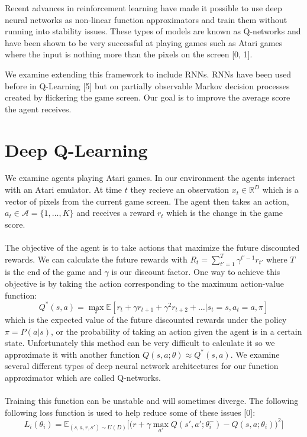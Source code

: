\documentclass{article}
\begin{document}
Recent advances in reinforcement learning have made it possible to use deep
neural networks as non-linear function approximators and train them without
running into stability issues. These types of models are known as Q-networks and
have been shown to be very successful at playing games such as Atari games where
the input is nothing more than the pixels on the screen [0, 1].

We examine extending this framework to include RNNs. RNNs have been used before
in Q-Learning [5] but on partially observable Markov decision processes created
by flickering the game screen. Our goal is to improve the average score the agent
receives.

\section{Deep Q-Learning}

We examine agents playing Atari games. In our environment the agents interact with
an Atari emulator. At time $t$ they recieve an observation $x_t \in \mathbb{R}^D$
which is a vector of pixels from the current game screen. The agent then takes an
action, $a_t \in \mathcal{A} = \{1, \dots, K\}$ and receives a reward $r_t$ which
is the change in the game score. \\
\\
The objective of the agent is to take actions that maximize the future discounted
rewards. We can calculate the future rewards with $R_t = \sum_{t' = 1}^T \gamma^{t'-1}r_{t'}$
where $T$ is the end of the game and $\gamma$ is our discount factor. One way
to achieve this objective is by taking the action corresponding to the maximum
action-value function:
$$Q^*(s,a) = \max_{\pi}\mathbb{E}[r_t + \gamma r_{t+1} + \gamma^2 r_{t+2} + \dots
|s_t = s, a_t = a, \pi]$$
which is the expected value of the future discounted rewards under the policy
$\pi = P(a|s)$, or the probability of taking an action given the agent is in a
certain state. Unfortunately this method can be very difficult to calculate it
so we approximate it with another function $Q(s,a;\theta) \approx Q^*(s,a)$. We
examine several different types of deep neural network architectures for our
function approximator which are called Q-networks. \\
\\
Training this function can be unstable and will sometimes diverge. The following
following loss function is used to help reduce some of these issues [0]:
\begin{equation}
    L_i(\theta_i) = \mathbb{E}_{(s,a,r,s') \sim U(D)}\Big[\Big(
    r + \gamma \max_{a'}Q(s',a';\theta_i^-) - Q(s,a;\theta_i)\Big)^2\Big]
\end{equation}
\end{document}
